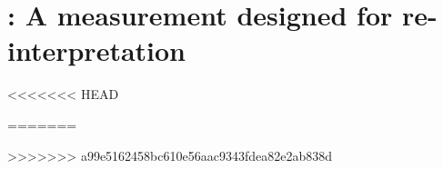 \chapter{\mFourL: A measurement designed for re-interpretation}
\label{chap:fourlepton}

<<<<<<< HEAD
 
 
 
  
  
 
  
  

 
=======










>>>>>>> a99e5162458bc610e56aac9343fdea82e2ab838d
